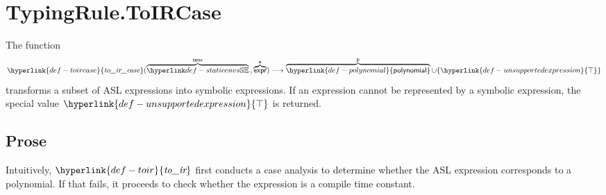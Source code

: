 \documentclass{book}
\newcommand\toir[0]{\hyperlink{def-toir}{\textfunc{to\_ir}}}
\newcommand\toircase[0]{\hyperlink{def-toircase}{\textfunc{to\_ir\_case}}}
\newcommand\polynomial[0]{\hyperlink{def-polynomial}{\textsf{polynomial}}}
\newcommand\CannotBeTransformed[0]{\hyperlink{def-unsupportedexpression}{\top}}
\begin{document}
\section{TypingRule.ToIRCase \label{sec:TypingRule.ToIRCase}}
\hypertarget{def-toircase}{}
The function
\[
  \toircase(\overname{\staticenvs}{\tenv} \aslsep \overname{\expr}{\ve}) \aslto \overname{\polynomial}{\vp} \cup \{\CannotBeTransformed\}
\]
transforms a subset of ASL expressions into symbolic expressions. If an expression cannot be represented
by a symbolic expression, the special value $\CannotBeTransformed$ is returned.

\subsection{Prose}
Intuitively, $\toir$ first conducts a case analysis to determine whether the ASL expression corresponds to a polynomial.
If that fails, it proceeds to check whether the expression is a compile time constant.

\newcommand\ProseOrTypeErrorOrBot[0]{\ProseTerminateAs{\CannotBeTransformed,\TypeErrorConfig}}
\end{document}
